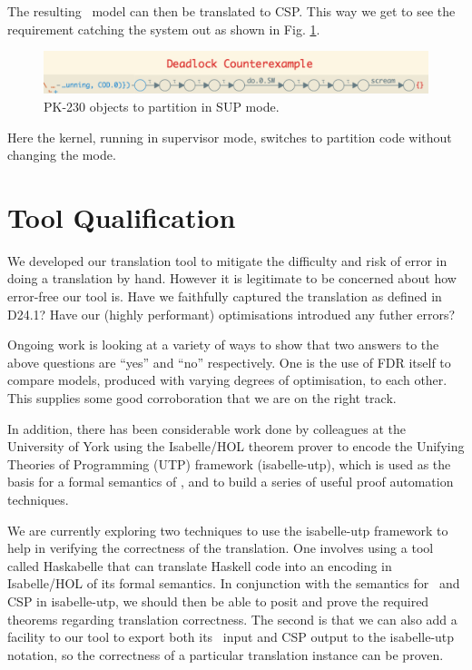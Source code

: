 The resulting \Circus\ model can then be translated to CSP.
This way we get to see the requirement catching the system out
as shown in Fig. \ref{fig:pk230-scream}.
\begin{figure}
\includegraphics[scale=0.4]{images/PK230-deadlock-example}
\caption{PK-230 objects to partition in SUP mode.}
\label{fig:pk230-scream}
\end{figure}
Here the kernel, running in supervisor mode, switches to partition
code without changing the mode.

\section{Tool Qualification}

We developed our translation tool to mitigate the difficulty
and risk of error in doing a translation by hand.
However it is legitimate to be concerned about how error-free
our tool is.
Have we faithfully captured the translation as defined in D24.1?
Have our (highly performant) optimisations introdued any futher errors?

Ongoing work is looking at a variety of ways to show that two answers
to the above questions are ``yes'' and ``no'' respectively.
One is the use of FDR itself to compare models,
produced with varying degrees of optimisation,
to each other.
This supplies some good corroboration that we are on the right track.

In addition, there has been considerable work done by colleagues at
the University of York using the Isabelle/HOL theorem prover\cite{NPW02}
to encode the Unifying Theories of Programming (UTP) framework (\textsf{isabelle-utp}),
which is used as the basis for a formal semantics of \Circus,
and to build a series of useful proof automation techniques\cite{FosterZW14}.

We are currently exploring two techniques to use the \textsf{isabelle-utp} framework
to help in verifying the correctness of the translation.
One involves using a tool called Haskabelle \cite{haskabelle09}
that can translate Haskell code into an encoding in Isabelle/HOL
of its formal semantics.
In conjunction with the semantics for \Circus\ and CSP in \textsf{isabelle-utp},
we should then be able to posit and prove the required theorems regarding
translation correctness.
The second is that we can also add a facility to our tool to export both
its \Circus\ input and CSP output to the \textsf{isabelle-utp} notation,
so the correctness of a particular translation instance can be proven.




